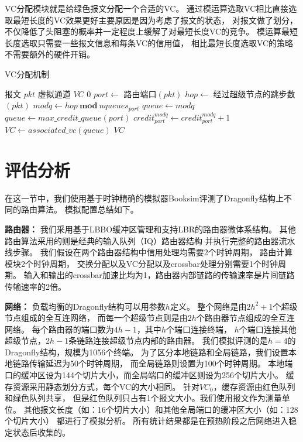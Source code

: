 VC分配模块就是给绿色报文分配一个合适的VC。
通过模运算选取VC相比直接选取最短长度的VC效果更好主要原因是因为考虑了报文的状态，
对报文做了划分，不仅降低了头阻塞的概率并一定程度上缓解了对最短长度VC的竞争。
模运算最短长度选取只需要一些报文信息和每条VC的信用值，
相比最短长度选取VC的策略不需要额外的硬件开销。

\begin{algorithm}[t]
  \centering
  \caption{VC分配机制}
  \label{algo:va}
  \begin{algorithmic}[1]
    \REQUIRE 报文 $pkt$
    \ENSURE 虚拟通道  $VC$
    \RETURN $0$
    \ENDIF
    \STATE $port \leftarrow$ 路由端口$(pkt)$
    \STATE $hop \leftarrow$ 经过超级节点的跳步数$(pkt)$
    \STATE $modq \leftarrow hop\ \textbf{mod}\ nqueues_{port}$
    \STATE $queue \leftarrow modq$
    \ELSE
    \STATE $queue \leftarrow max\_credit\_queue(port)$
    \ENDIF
    \STATE $credit_{port}^{modq} \leftarrow credit_{port}^{modq} + 1$
    \STATE $VC \leftarrow associated\_vc(queue)$
    \RETURN $VC$
  \end{algorithmic}
\end{algorithm}

\section{评估分析}

在这一节中，我们使用基于时钟精确的模拟器Booksim评测了Dragonfly结构上不同的路由算法。
模拟配置总结如下。

\textbf{路由器：}
我们采用基于LBBO缓冲区管理和支持LBR的路由器微体系结构。
其他路由算法采用的则是经典的输入队列（IQ）路由器结构
并执行完整的路由器流水线步骤。
我们假设在两个路由器结构中信用处理均需要2个时钟周期，
路由计算模块2个时钟周期，
交换分配以及VC分配以及crossbar处理分别需要1个时钟周期。
输入和输出的crossbar加速比均为1，路由器内部链路的传输速率是片间链路传输速率的2倍。

\textbf{网络：}
负载均衡的Dragonfly结构可以用参数$h$定义。
整个网络是由$2h^2+1$个超级节点组成的全互连网络，
而每一个超级节点则是由$2h$个路由器节点组成的全互连网络。
每个路由器的端口数为$4h-1$，其中$h$个端口连接终端，
$h$个端口连接其他超级节点，$2h-1$条链路连接超级节点内部的路由器。
我们模拟评测的是$h=4$的Dragonfly结构，规模为1056个终端。
为了区分本地链路和全局链路，我们设置本地链路传输延迟为50个时钟周期，
而全局链路则设置为100个时钟周期。
本地端口的缓冲区设为144个切片大小，而全局端口的缓冲区则设为256个切片大小。
缓存资源采用静态划分方式，每个VC的大小相同。
针对$VC_0$，缓存资源由红色队列和绿色队列共享，
但是红色队列只占有1个报文大小。我们使用报文作为测量单位。
其他报文长度（如：16个切片大小）和其他全局端口的缓冲区大小（如：128个切片大小）
都进行了模拟分析。
所有统计结果都是在预热阶段之后网络进入稳定状态后收集的。

